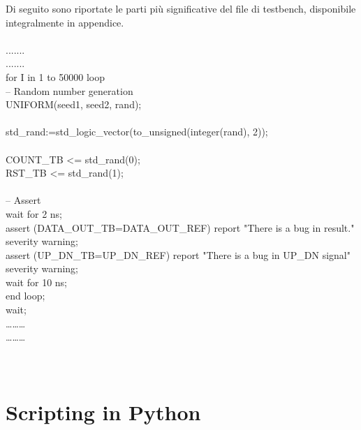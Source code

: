 Di seguito sono riportate le parti più significative del file di testbench, disponibile         integralmente in appendice.\\
\\
.......\\
.......\\
for I in 1 to 50000 loop\\
-- Random number generation\\
UNIFORM(seed1, seed2, rand);\\
\\
std\_rand:=std\_logic\_vector(to\_unsigned(integer(rand), 2));\\
\\
COUNT\_TB    <= std\_rand(0);\\
RST\_TB    <= std\_rand(1); \\
\\
-- Assert\\
wait for 2 ns;\\
assert (DATA\_OUT\_TB=DATA\_OUT\_REF) report "There is a bug in result." severity warning;\\
assert (UP\_DN\_TB=UP\_DN\_REF) report "There is a bug in UP\_DN signal" severity warning;\\
wait for 10 ns;\\
end loop;\\
wait;\\
………\\
………\\
\\
\\
\section{Scripting in Python}
